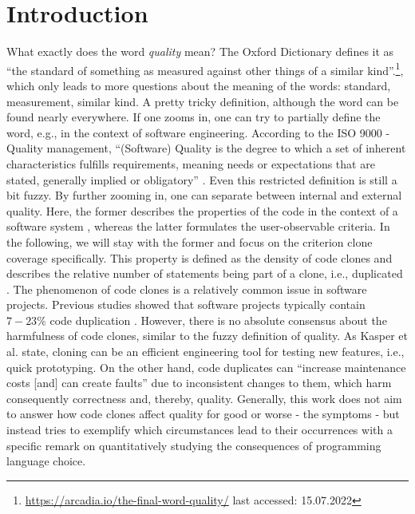 
\section{Introduction}
\label{sec:intro}

What exactly does the word \textit{quality} mean? The Oxford Dictionary defines it as ``the standard of something as measured against other things of a similar kind''.\footnote{\url{https://arcadia.io/the-final-word-quality/} last accessed: 15.07.2022}, which only leads to more questions about the meaning of the words: standard, measurement, similar kind. A pretty tricky definition, although the word can be found nearly everywhere.
If one zooms in, one can try to partially define the word, e.g., in the context of software engineering. According to the ISO 9000 - Quality management, ``(Software) Quality is the degree to which a set of inherent characteristics fulfills requirements, meaning needs or expectations that are stated, generally implied or obligatory'' \cite{matthes2020ase}.
Even this restricted definition is still a bit fuzzy. By further zooming in, one can separate between internal and external quality. Here, the former describes the properties of the code in the context of a software system \cite{pretschner2022requirements}, whereas the latter formulates the user-observable criteria.
In the following, we will stay with the former and focus on the criterion clone coverage specifically.
This property is defined as the density of code clones and describes the relative number of statements being part of a clone, i.e., duplicated \cite{knilling2020priorisierung}.
The phenomenon of code clones is a relatively common issue in software projects. Previous studies showed that software projects typically contain $7 -23\%$ code duplication \cite{koschke2007survey}.
However, there is no absolute consensus about the harmfulness of code clones, similar to the fuzzy definition of quality. As Kasper et al. \cite{kasper2006cloning} state, cloning can be an efficient engineering tool for testing new features, i.e., quick prototyping.
On the other hand, code duplicates can ``increase maintenance costs [and] can create faults'' \cite{juergens2009code} due to inconsistent changes to them, which harm consequently correctness and, thereby, quality.
Generally, this work does not aim to answer how code clones affect quality for good or worse - the symptoms - but instead tries to exemplify which circumstances lead to their occurrences with a specific remark on quantitatively studying the consequences of programming language choice.